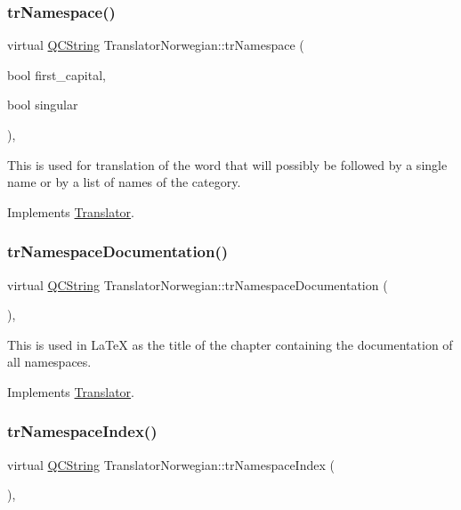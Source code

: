 \subsubsection{\texorpdfstring{trNamespace()}{trNamespace()}}
{\footnotesize\ttfamily virtual \mbox{\hyperlink{class_q_c_string}{Q\+C\+String}} Translator\+Norwegian\+::tr\+Namespace (\begin{DoxyParamCaption}\item[{bool}]{first\+\_\+capital,  }\item[{bool}]{singular }\end{DoxyParamCaption})\hspace{0.3cm}{\ttfamily [inline]}, {\ttfamily [virtual]}}

This is used for translation of the word that will possibly be followed by a single name or by a list of names of the category. 

Implements \mbox{\hyperlink{class_translator}{Translator}}.

\mbox{\label{class_translator_norwegian_aecd64d94d95be5bc4bd4dada4e589c2c}} 
\subsubsection{\texorpdfstring{trNamespaceDocumentation()}{trNamespaceDocumentation()}}
{\footnotesize\ttfamily virtual \mbox{\hyperlink{class_q_c_string}{Q\+C\+String}} Translator\+Norwegian\+::tr\+Namespace\+Documentation (\begin{DoxyParamCaption}{ }\end{DoxyParamCaption})\hspace{0.3cm}{\ttfamily [inline]}, {\ttfamily [virtual]}}

This is used in La\+TeX as the title of the chapter containing the documentation of all namespaces. 

Implements \mbox{\hyperlink{class_translator}{Translator}}.

\mbox{\label{class_translator_norwegian_a9ad74ebb1b841012158985eeff47bfcf}} 
\subsubsection{\texorpdfstring{trNamespaceIndex()}{trNamespaceIndex()}}
{\footnotesize\ttfamily virtual \mbox{\hyperlink{class_q_c_string}{Q\+C\+String}} Translator\+Norwegian\+::tr\+Namespace\+Index (\begin{DoxyParamCaption}{ }\end{DoxyParamCaption})\hspace{0.3cm}{\ttfamily [inline]}, {\ttfamily [virtual]}}

